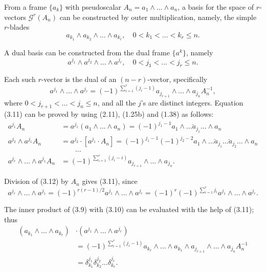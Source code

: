 \documentclass[fleqn]{scrartcl}
\numberwithin{equation}{section}
\begin{document}
\vspace{1em}
\noindent From a frame \(\{a_k\}\) with pseudoscalar \(A_n = a_1 \wedge \dots \wedge a_n\), a basis for the space of \(r\)-vectors \(\mathscr{G}^r(A_n)\) can be constructed by outer multiplication, namely, the simple \(r\)-blades
\begin{equation}
a_{k_1} \wedge a_{k_2} \wedge \dots \wedge a_{k_r}, \quad 0 < k_1 < \dots < k_r \leq n. \tag{3.9}
\end{equation}

\noindent A dual basis can be constructed from the dual frame \(\{a^k\}\), namely
\begin{equation}
a^{j_1} \wedge a^{j_2} \wedge \dots \wedge a^{j_r}, \quad 0 < j_1 < \dots < j_r \leq n. \tag{3.10}
\end{equation}

\noindent Each such \(r\)-vector is the dual of an \((n - r)\)-vector, specifically
\begin{equation}
a^{j_1} \wedge \dots \wedge a^{j_r} = (-1)^{\sum_{i=1}^r (j_i - 1)} a_{j_{r+1}} \wedge \dots \wedge a_{j_n} A_n^{-1}, \tag{3.11}
\end{equation}
where \(0 < j_{r+1} < \dots < j_n \leq n\), and all the \(j\)'s are distinct integers. Equation (3.11) can be proved by using (2.11), (1.25b) and (1.38) as follows:
\begin{equation}
\begin{aligned}
a^{j_1} A_n &= a^{j_1} (a_1 \wedge \dots \wedge a_n) = (-1)^{j_1 - 1} a_1 \wedge \dots \breve{a}_{j_1} \dots \wedge a_n \\
a^{j_2} \wedge a^{j_1} A_n &= a^{j_2} \cdot [a^{j_1} \cdot A_n] = (-1)^{j_1 - 1} (-1)^{j_2 - 2} a_1 \wedge \dots \breve{a}_{j_1} \dots \breve{a}_{j_2} \dots \wedge a_n \\
&\qquad \dots \\
a^{j_r} \wedge \dots \wedge a^{j_1} A_n &= (-1)^{\sum_{i=1}^r (j_i - i)} a_{j_{r+1}} \wedge \dots \wedge a_{j_n}.
\end{aligned}
\tag{3.12}
\end{equation}

\noindent Division of (3.12) by \(A_n\) gives (3.11), since
\begin{equation}
a^{j_r} \wedge \dots \wedge a^{j_1} = (-1)^{r(r-1)/2} a^{j_1} \wedge \dots \wedge a^{j_r} = (-1)^r (-1)^{\sum_{i=1}^r j_i} a^{j_1} \wedge \dots \wedge a^{j_r}. \tag{3.13}
\end{equation}

\noindent The inner product of (3.9) with (3.10) can be evaluated with the help of (3.11); thus
\begin{equation}
\begin{aligned}
(a_{k_1} \wedge \dots \wedge a_{k_r}) &\cdot (a^{j_1} \wedge \dots \wedge a^{j_r}) \\
&= (-1)^{\sum_{i=1}^r (j_i - 1)} a_{k_r} \wedge \dots \wedge a_{k_1} \wedge a_{j_{r+1}} \wedge \dots \wedge a_{j_n} A_n^{-1} \\
&= \delta_{k_1}^{j_1} \delta_{k_2}^{j_2} \dots \delta_{k_r}^{j_r}.
\end{aligned}
\tag{3.14}
\end{equation}
\end{document}
